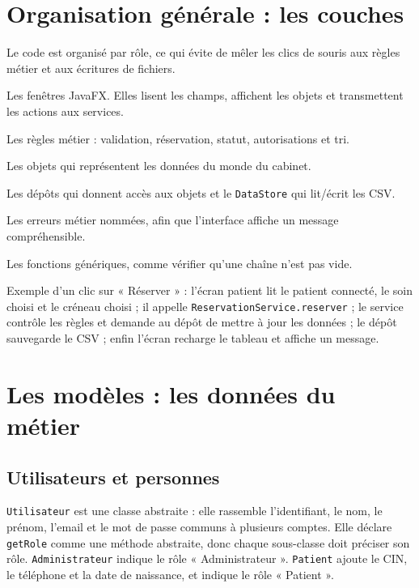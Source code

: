 \documentclass[11pt,a4paper]{report}
\begin{document}
\chapter{Organisation générale : les couches}
Le code est organisé par rôle, ce qui évite de mêler les clics de souris aux règles métier et aux écritures de fichiers.
\begin{description}[leftmargin=3.2cm,style=nextline]
\item[\texttt{ui}] Les fenêtres JavaFX. Elles lisent les champs, affichent les objets et transmettent les actions aux services.
\item[\texttt{service}] Les règles métier : validation, réservation, statut, autorisations et tri.
\item[\texttt{model}] Les objets qui représentent les données du monde du cabinet.
\item[\texttt{persistence}] Les dépôts qui donnent accès aux objets et le \texttt{DataStore} qui lit/écrit les CSV.
\item[\texttt{exception}] Les erreurs métier nommées, afin que l'interface affiche un message compréhensible.
\item[\texttt{util}] Les fonctions génériques, comme vérifier qu'une chaîne n'est pas vide.
\end{description}

Exemple d'un clic sur « Réserver » : l'écran patient lit le patient connecté, le soin choisi et le créneau choisi ; il appelle \texttt{ReservationService.reserver} ; le service contrôle les règles et demande au dépôt de mettre à jour les données ; le dépôt sauvegarde le CSV ; enfin l'écran recharge le tableau et affiche un message.

\chapter{Les modèles : les données du métier}
\section{Utilisateurs et personnes}
\texttt{Utilisateur} est une classe abstraite : elle rassemble l'identifiant, le nom, le prénom, l'email et le mot de passe communs à plusieurs comptes. Elle déclare \texttt{getRole} comme une méthode abstraite, donc chaque sous-classe doit préciser son rôle. \texttt{Administrateur} indique le rôle « Administrateur ». \texttt{Patient} ajoute le CIN, le téléphone et la date de naissance, et indique le rôle « Patient ».
\end{document}
